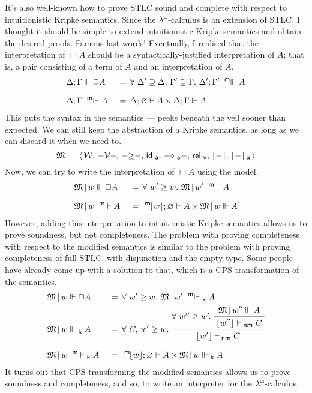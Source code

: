 \documentclass{entcs}
\numberwithin{equation}{thm}
\newcommand{\lambdabox}{\lambda^{\mkern-1mu\sq\mkern-2mu}}
\newcommand{\binop}[1]{-\mathord{#1}-}
\newcommand{\tsf}[1]{\textsf{\upshape{#1}}}
\newcommand{\stsf}[1]{\tsf{\small{#1}}}
\renewcommand{\:}{\mathrel{:}}
\let\oldforall\forall
\renewcommand{\forall}{\oldforall\,}
\newcommand{\0}{\varnothing}
\renewcommand{\geq}{\mathrel{\supseteq}}
\newcommand{\sq}{\Box}
\renewcommand{\e}{\mathrel{\vdash}}
\newcommand{\enm}{\mathrel{\vdash_{\mkern-2mu\stsf{nm}}}}
\newcommand{\M}{\mathfrak{M}}
\newcommand{\W}{\mathcal{W}}
\newcommand{\V}{\mathrel{\mathcal{V}}}
\newcommand{\ida}{\operatorname{\tsf{id}_{\stsf{a}}}}
\newcommand{\compa}{\mathrel{\circ_{\stsf{a}}}}
\newcommand{\relv}{\operatorname{\tsf{rel}_{\stsf{v}}}}
\newcommand{\peek}[1]{\mathopen{\lfloor}{#1}\mathclose{\rfloor}}
\newcommand{\peeka}[1]{\mathopen{\lfloor}{#1}\mathclose{\rfloor_{\mkern-2mu\stsf{a}}}}
\newcommand{\mpeek}[1]{\mathopen{^{\stsf{m}\mkern-3mu}\lfloor}{#1}\mathclose{\rfloor}}
\newcommand{\ee}{\mathrel{\Vdash}}
\newcommand{\eek}{\mathrel{\Vdash_{\stsf{k}}}}
\newcommand{\mee}{\mathrel{^{\stsf{m}\mkern-6mu}\Vdash}}
\newcommand{\meek}{\mathrel{^{\stsf{m}\mkern-6mu}\Vdash_{\stsf{k}}}}
\begin{document}
It's also well-known how to prove STLC sound and complete with respect to intuitionistic Kripke semantics.  Since the $\lambdabox$-calculus is an extension of STLC, I thought it should be simple to extend intuitionistic Kripke semantics and obtain the desired proofs.  Famous last words!  Eventually, I realised that the interpretation of $\sq A$ should be a syntactically-justified interpretation of $A$; that is, a pair consisting of a term of $A$ and an interpretation of $A$.
\begin{alignat*}{2}
  & \Delta; \Gamma \ee \sq A \,&&=\, \forall \Delta' \geq \Delta,\,\Gamma' \geq \Gamma.\ \Delta'; \Gamma' \mee A\\[0.5\baselineskip]
  & \Delta; \Gamma \mee A    \,&&=\, \Delta; \0 \e A \times \Delta; \Gamma \ee A
\end{alignat*}
This puts the syntax in the semantics --- peeks beneath the veil sooner than expected.  We can still keep the abstraction of a Kripke semantics, as long as we can discard it when we need to.
  \[\M \,=\, \langle\,\W,\,\binop{\V},\,\binop{\ge},\,\ida,\,\binop{\compa},\,\relv,\,\peek{-},\,\peeka{-}\,\rangle\]
Now, we can try to write the interpretation of $\sq A$ using the model.
\begin{alignat*}{2}
  & \M\,|\,w \ee \sq A \,&&=\, \forall w' \ge w.\ \M\,|\,w' \mee A\\[0.5\baselineskip]
  & \M\,|\,w \mee A    \,&&=\, \mpeek{w}; \0 \e A \times \M\,|\,w \ee A
\end{alignat*}
However, adding this interpretation to intuitionistic Kripke semantics allows us to prove soundness, but not completeness.  The problem with proving completeness with respect to the modified semantics is similar to the problem with proving completeness of full STLC, with disjunction and the empty type.  Some people have already come up with a solution to that, which is a CPS transformation of the semantics.
\begin{alignat*}{2}
  & \M\,|\,w \ee \sq A \,&&=\, \forall w' \ge w.\ \M\,|\,w' \meek A\\
  & \M\,|\,w \eek A    \,&&=\, \forall C,\,w' \ge w.\ \raisebox{-8pt}{\prftree{\raisebox{8pt}{$\forall w'' \ge w'\mkern-2mu.\ $}\prftree{\M\,|\,w'' \ee A}{\lfloor w'' \rfloor \enm C}}{\lfloor w' \rfloor \enm C}}\\[0.5\baselineskip]
  & \M\,|\,w \meek A \,&&=\, \mpeek{w}; \0 \e A \times \M\,|\,w \eek A
\end{alignat*}
It turns out that CPS transforming the modified semantics allows us to prove soundness and completeness, and so, to write an interpreter for the $\lambdabox$-calculus.
\end{document}
